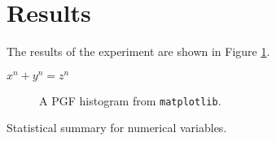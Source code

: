 

\section{Results}

The results of the experiment are shown in Figure \ref{fig:figure_count_responses}.

$ x^n + y^n = z^n $

\begin{figure}
    \begin{center}
        
    \end{center}
    \caption{A PGF histogram from \texttt{matplotlib}.}\label{fig:figure_count_responses}
\end{figure}

\begin{center}

	\begin{table}[!t]
	\caption{Statistical summary for numerical variables.
	{\label{tab:stats_num_data}}}
	
	\end{table}
\end{center}